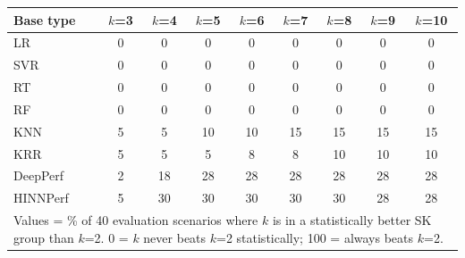 \begin{tabular}{lcccccccc}
\toprule
Base type & $k$=3 & $k$=4 & $k$=5 & $k$=6 & $k$=7 & $k$=8 & $k$=9 & $k$=10 \\
\midrule
LR & 0 & 0 & 0 & 0 & 0 & 0 & 0 & 0 \\
SVR & 0 & 0 & 0 & 0 & 0 & 0 & 0 & 0 \\
RT & 0 & 0 & 0 & 0 & 0 & 0 & 0 & 0 \\
RF & 0 & 0 & 0 & 0 & 0 & 0 & 0 & 0 \\
KNN & 5 & 5 & 10 & 10 & 15 & 15 & 15 & 15 \\
KRR & 5 & 5 & 5 & 8 & 8 & 10 & 10 & 10 \\
DeepPerf & 2 & 18 & 28 & 28 & 28 & 28 & 28 & 28 \\
HINNPerf & 5 & 30 & 30 & 30 & 30 & 30 & 28 & 28 \\
\bottomrule
\multicolumn{9}{l}{\footnotesize Values = \% of 40 evaluation scenarios where $k$ is in a statistically better SK group than $k$=2. 0 = $k$ never beats $k$=2 statistically; 100 = always beats $k$=2.}} \\
\end{tabular}
